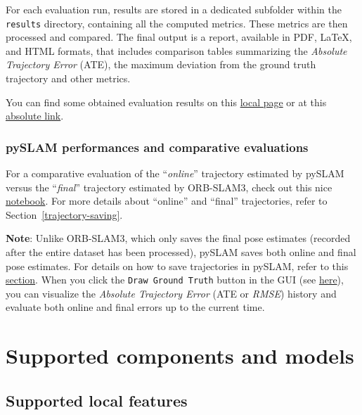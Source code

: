 \documentclass{article}
\begin{document}
For each evaluation run, results are
stored in a dedicated subfolder within the \texttt{results} directory,
containing all the computed metrics. These metrics are then processed
and compared. The final output is a report, available in PDF,
LaTeX, and HTML formats, that includes comparison tables summarizing the
\emph{Absolute Trajectory Error} (ATE), the maximum deviation from the
ground truth trajectory and other metrics.

You can find some obtained evaluation results on this 
\href{./docs/evaluations/evaluations.md}{local page} or at this \href{https://github.com/luigifreda/pyslam/blob/master/docs/evaluations/evaluations.md}{absolute link}.

\hypertarget{pyslam-performances-and-comparative-evaluations}{%
\subsubsection{pySLAM performances and comparative
evaluations}\label{pyslam-performances-and-comparative-evaluations}}

For a comparative evaluation of the ``\textit{online}'' trajectory
estimated by pySLAM versus the ``\textit{final}'' trajectory estimated
by ORB-SLAM3, check out this nice
\href{https://github.com/anathonic/Trajectory-Comparison-ORB-SLAM3-pySLAM/blob/main/trajectories_comparison.ipynb}{notebook}.
For more details about ``online'' and ``final''
trajectories, refer to Section~\ref{trajectory-saving}.

\textbf{Note}: Unlike ORB-SLAM3, which only saves the final pose
estimates (recorded after the entire dataset has been processed), pySLAM
saves both online and final pose estimates. For details on how to save
trajectories in pySLAM, refer to this
\protect\hyperlink{trajectory-saving}{section}. When you click the
\texttt{Draw\ Ground\ Truth} button in the GUI (see
\protect\hyperlink{slam-gui}{here}), you can visualize the
\emph{Absolute Trajectory Error} (ATE or \emph{RMSE}) history and
evaluate both online and final errors up to the current time.

\hypertarget{supported-components-and-models}{%
\section{Supported components and
models}\label{supported-components-and-models}}

\hypertarget{supported-local-features}{%
\subsection{Supported local
features}\label{supported-local-features}}
\end{document}
